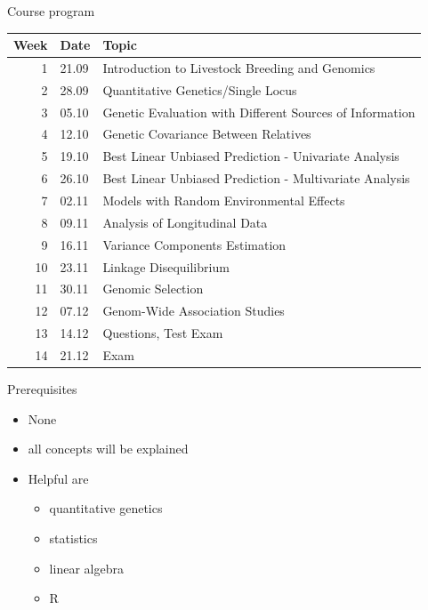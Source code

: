 \documentclass[ignorenonframetext,]{beamer}
\providecommand{\tightlist}{%
  \setlength{\itemsep}{0pt}\setlength{\parskip}{0pt}}
\begin{document}
\begin{frame}{Course program}
\protect\hypertarget{course-program}{}

\begin{longtable}[]{@{}rll@{}}
\toprule
Week & Date & Topic\tabularnewline
\midrule
\endhead
1 & 21.09 & Introduction to Livestock Breeding and
Genomics\tabularnewline
2 & 28.09 & Quantitative Genetics/Single Locus\tabularnewline
3 & 05.10 & Genetic Evaluation with Different Sources of
Information\tabularnewline
4 & 12.10 & Genetic Covariance Between Relatives\tabularnewline
5 & 19.10 & Best Linear Unbiased Prediction - Univariate
Analysis\tabularnewline
6 & 26.10 & Best Linear Unbiased Prediction - Multivariate
Analysis\tabularnewline
7 & 02.11 & Models with Random Environmental Effects\tabularnewline
8 & 09.11 & Analysis of Longitudinal Data\tabularnewline
9 & 16.11 & Variance Components Estimation\tabularnewline
10 & 23.11 & Linkage Disequilibrium\tabularnewline
11 & 30.11 & Genomic Selection\tabularnewline
12 & 07.12 & Genom-Wide Association Studies\tabularnewline
13 & 14.12 & Questions, Test Exam\tabularnewline
14 & 21.12 & Exam\tabularnewline
\bottomrule
\end{longtable}


\end{frame}

\begin{frame}{Prerequisites}
\protect\hypertarget{prerequisites}{}

\begin{itemize}
\tightlist
\item
  None
\item
  all concepts will be explained
\item
  Helpful are

  \begin{itemize}
  \tightlist
  \item
    quantitative genetics
  \item
    statistics
  \item
    linear algebra
  \item
    R
  \end{itemize}
\end{itemize}


\end{frame}
\end{document}
